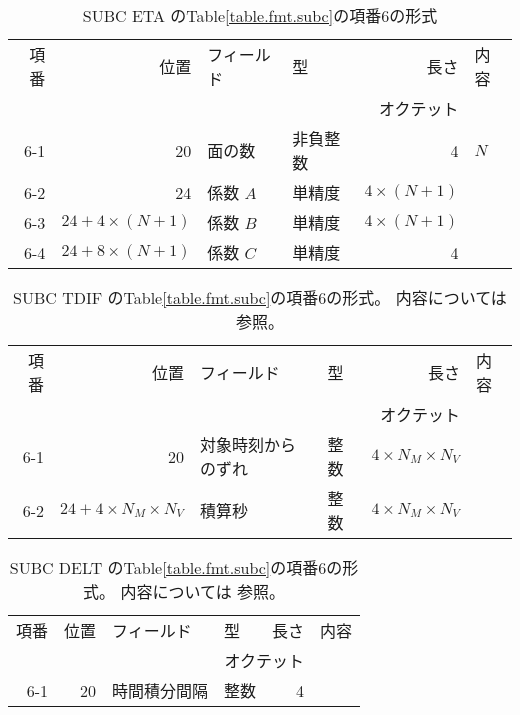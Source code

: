 \begin{table}[htp]
 \begin{center}
  \begin{tabular}{rr|llrl}
 \hline
 項番 & 位置 & フィールド & 型 & 長さ & 内容 \\
      &      &            & \multicolumn{2}{r}{オクテット} &  \\
 \hline
   6-1 & 20             & 面の数      & 非負整数      & 4 & $N$ \\
   6-2 & 24             & 係数 $A$         & 単精度   & $4\times (N+1)$ & \\ 
   6-3 & $24+4\times (N+1)$ & 係数 $B$         & 単精度   & $4\times (N+1)$ & \\ 
   6-4 & $24+8\times (N+1)$ & 係数 $C$         & 単精度   & 4 & \\ \hline 
  \end{tabular}
 \end{center}
 \caption{SUBC ETA のTable\ref{table.fmt.subc}の項番6の形式}
 \label{table.fmt.subc.eta}
\end{table}

\begin{table}[htp]
 \begin{center}
  \begin{tabular}{rr|llrl}
 \hline
 項番 & 位置 & フィールド & 型 & 長さ & 内容 \\
      &      &            & \multicolumn{2}{r}{オクテット} &  \\
 \hline
   6-1 & 20  & 対象時刻からのずれ & 整数   & $4\times N_M  \times N_V$ & \\
   6-2 & $24+4\times N_M  \times N_V$ 
               & 積算秒         & 整数   & $4\times N_M  \times N_V$ & \\ \hline 
  \end{tabular}
 \end{center}
 \caption{SUBC TDIF のTable\ref{table.fmt.subc}の項番6の形式。
  内容については  参照。
 }
 \label{table.fmt.subc.tdif}
\end{table}

\begin{table}[htp]
 \begin{center}
  \begin{tabular}{rr|llrl}
 \hline
 項番 & 位置 & フィールド & 型 & 長さ & 内容 \\
      &      &            & \multicolumn{2}{r}{オクテット} &  \\
 \hline
   6-1 & 20  & 時間積分間隔 & 整数   & 4 & \\
  \hline
  \end{tabular}
 \end{center}
 \caption{SUBC DELT のTable\ref{table.fmt.subc}の項番6の形式。
  内容については  参照。
 }
 \label{table.fmt.subc.delt}
\end{table}

